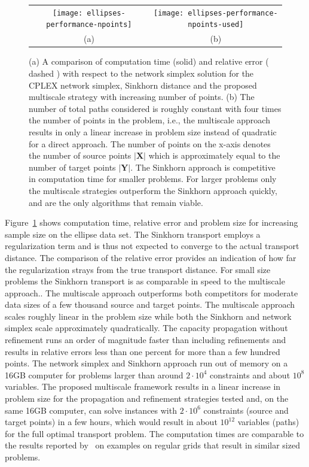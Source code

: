 \documentclass[twoside,11pt]{article}
\newcommand{\Xsp}{{\mathbf{X}}}
\newcommand{\Ysp}{{\mathbf{Y}}}
\begin{document}
\begin{figure}[htb]
\centering
\begin{tabular}{cc}
  \texttt{[image: ellipses-performance-npoints]} &
\texttt{[image: ellipses-performance-npoints-used]} \\
(a) & (b)
\end{tabular}
\caption{
\label{fig:npoints}
(a) A comparison of computation time (solid) and relative error ( dashed ) with
respect to the network simplex solution for the CPLEX network simplex, Sinkhorn
distance and the proposed multiscale strategy with increasing number of points.
(b) The number of total paths considered is roughly constant with four times
the number of points in the problem, i.e., the multiscale approach results in
only a linear increase in problem size instead of quadratic for a direct
approach.  The number of points on the x-axis denotes the number of source
points $|\Xsp|$ which is approximately equal to the number of target points
$|\Ysp|$.  The Sinkhorn approach is competitive in computation time for smaller
problems.  For larger problems only the multiscale strategies outperform the
Sinkhorn approach quickly, and are the only algorithms that remain viable.
} 
\end{figure}
Figure~\ref{fig:npoints} shows computation time, relative error and problem
size for increasing sample size on the ellipse data set. The Sinkhorn transport
employs a regularization term and is thus not expected to converge to the
actual transport distance. The comparison of the relative error provides an
indication of how far the regularization strays from the true transport
distance. For small size problems the Sinkhorn transport is as comparable in
speed to the multiscale approach.. The multiscale approach outperforms both
competitors for moderate data sizes of a few thousand source and target points.
The multiscale approach scales roughly linear in the problem size while both
the Sinkhorn and network simplex scale approximately quadratically. The
capacity propagation without refinement runs an order of magnitude faster than
including refinements and results in relative errors less than one percent for
more than a few hundred points.  The network simplex and Sinkhorn approach run
out of memory on a 16GB computer for problems larger than around $2\cdot10^4$
constraints and about $10^8$ variables. The proposed multiscale framework
results in a linear increase in problem size for the propagation and refinement
strategies tested and, on the same 16GB computer, can solve instances with
$2\cdot10^6$ constraints (source and target points) in a few hours, which would
result in about $10^{12}$ variables (paths) for the full optimal transport
problem.  The computation times are comparable to the results reported
by~\citet{oberman2015efficient,schmitzer2015sparse} on examples on regular grids
that result in similar sized problems. 
\end{document}
